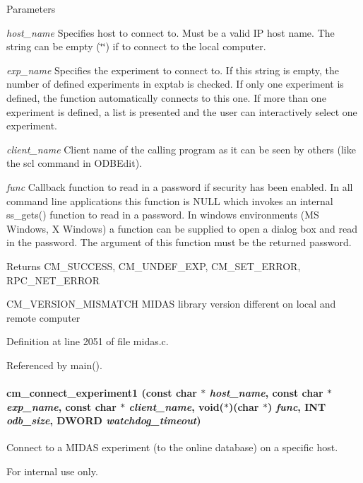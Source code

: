 \begin{DoxyParams}{Parameters}
\item[{\em host\_\-name}]Specifies host to connect to. Must be a valid IP host name. The string can be empty (\char`\"{}\char`\"{}) if to connect to the local computer. \item[{\em exp\_\-name}]Specifies the experiment to connect to. If this string is empty, the number of defined experiments in exptab is checked. If only one experiment is defined, the function automatically connects to this one. If more than one experiment is defined, a list is presented and the user can interactively select one experiment. \item[{\em client\_\-name}]Client name of the calling program as it can be seen by others (like the scl command in ODBEdit). \item[{\em func}]Callback function to read in a password if security has been enabled. In all command line applications this function is NULL which invokes an internal ss\_\-gets() function to read in a password. In windows environments (MS Windows, X Windows) a function can be supplied to open a dialog box and read in the password. The argument of this function must be the returned password. \end{DoxyParams}
\begin{DoxyReturn}{Returns}
CM\_\-SUCCESS, CM\_\-UNDEF\_\-EXP, CM\_\-SET\_\-ERROR, RPC\_\-NET\_\-ERROR \par
 CM\_\-VERSION\_\-MISMATCH MIDAS library version different on local and remote computer 
\end{DoxyReturn}


Definition at line 2051 of file midas.c.

Referenced by main().
\paragraph[{cm\_\-connect\_\-experiment1}]{ cm\_\-connect\_\-experiment1 (const char $\ast$ {\em host\_\-name}, \/  const char $\ast$ {\em exp\_\-name}, \/  const char $\ast$ {\em client\_\-name}, \/  void($\ast$)(char $\ast$) {\em func}, \/  {\bf INT} {\em odb\_\-size}, \/  {\bf DWORD} {\em watchdog\_\-timeout})}\hfill\label{group__cmfunctionc_ga4dfbe7e4683c5f1e7f7cc1f6f998bdda}
Connect to a MIDAS experiment (to the online database) on a specific host. \begin{DoxyInternal}{For internal use only.}
\end{DoxyInternal}


